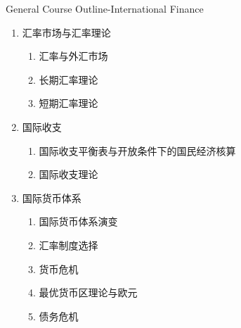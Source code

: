 \documentclass[10pt,hyperref={CJKbookmarks=true},xcolor=dvipsnames,aspectratio=43]{beamer}
\begin{document}
\begin{frame}{General Course Outline-International Finance}

\begin{enumerate}
	\item 汇率市场与汇率理论 
		\begin{enumerate}
			\item 汇率与外汇市场
			\item 长期汇率理论
			\item 短期汇率理论
		\end{enumerate}

	\item 国际收支 
		\begin{enumerate}
			\item 国际收支平衡表与开放条件下的国民经济核算
			\item 国际收支理论
		\end{enumerate}

	\item 国际货币体系 
		\begin{enumerate}
			\item 国际货币体系演变
			\item 汇率制度选择
			\item 货币危机
			\item 最优货币区理论与欧元
			\item 债务危机
		\end{enumerate}

\end{enumerate}
\end{frame}
\end{document}
